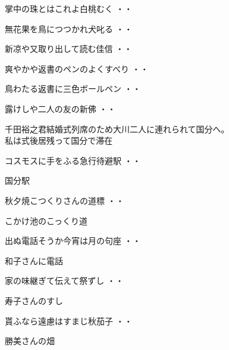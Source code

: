 \begin{shiika}掌中の珠とはこれよ白桃むく
\hfill{・・}\end{shiika}
\vspace{0.6cm}
\begin{shiika}無花果を鳥につつかれ犬叱る
\hfill{・・}\end{shiika}
\vspace{0.6cm}
\begin{shiika}新凉や又取り出して読む佳信
\hfill{・・}\end{shiika}
\vspace{0.6cm}
\begin{shiika}爽やかや返書のペンのよくすべり
\hfill{・・}\end{shiika}
\vspace{0.6cm}
\begin{shiika}鳥わたる返書に三色ボールペン
\hfill{・・}\end{shiika}
\vspace{0.6cm}
\begin{shiika}露けしや二人の友の新佛
\hfill{・・}\end{shiika}
\vspace{0.6cm}

千田裕之君結婚式列席のため大川二人に連れられて国分へ。\\
私は式後居残って国分で滞在
\begin{shiika}コスモスに手をふる急行待避駅
\hfill{・・}\end{shiika}
\qquad\qquad\qquad 国分駅\\
\begin{shiika}秋夕焼こつくりさんの道標
\hfill{・・}\end{shiika}
\qquad\qquad\qquad こかけ池のこっくり道\\
\begin{shiika}出ぬ電話そうか今宵は月の句座
\hfill{・・}\end{shiika}
\qquad\qquad\qquad 和子さんに電話\\
\begin{shiika}家の味継ぎて伝えて祭ずし
\hfill{・・}\end{shiika}
\qquad\qquad\qquad 寿子さんのすし\\
\begin{shiika}貰ふなら遠慮はすまじ秋茄子
\hfill{・・}\end{shiika}
\qquad\qquad\qquad 勝美さんの畑\\

